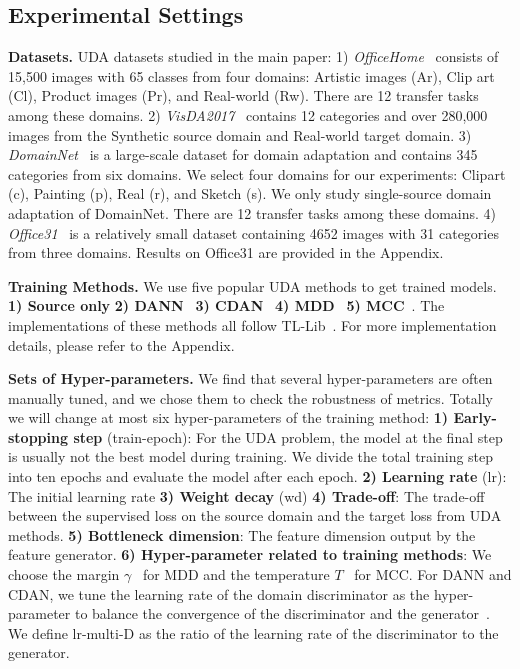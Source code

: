 \documentclass{article} %
\begin{document}
\subsection{Experimental Settings}
\label{sec:4.1}

\textbf{Datasets.} 
UDA datasets studied in the main paper: 
1) \textit{OfficeHome}~\cite{officehome} consists of 15,500 images with 65 classes from four domains: Artistic images (Ar), Clip art (Cl), Product images (Pr), and Real-world (Rw). There are 12 transfer tasks among these domains. 
2) \textit{VisDA2017}~\cite{visda} contains 12 categories and over 280,000 images from the Synthetic source domain and Real-world target domain.  
3) \textit{DomainNet}~\cite{domainnet} is a large-scale dataset for domain adaptation and contains 345 categories from six domains. We select four domains for our experiments: Clipart (c), Painting (p), Real (r), and Sketch (s). We only study single-source domain adaptation of DomainNet. There are 12 transfer tasks among these domains. 
4) \textit{Office31}~\cite{office} is a relatively small dataset containing 4652 images with 31 categories from three domains. Results on Office31 are provided in the Appendix. 

\textbf{Training Methods.} 
We use five popular UDA methods to get trained models. \textbf{1) Source only} \textbf{2) DANN}~\cite{DANN} \textbf{3) CDAN}~\cite{CDAN} \textbf{4) MDD}~\cite{MDD} \textbf{5) MCC}~\cite{MCC}.
The implementations of these methods all follow TL-Lib~\cite{tllib}.
For more implementation details, please refer to the Appendix.

\textbf{Sets of Hyper-parameters.} 
\label{sec:4.1.3}
We find that several hyper-parameters are often manually tuned, and we chose them to check the robustness of metrics. Totally we will change at most six hyper-parameters of the training method: \textbf{1) Early-stopping step} (train-epoch): For the UDA problem, the model at the final step is usually not the best model during training. 
We divide the total training step into ten epochs and evaluate the model after each epoch. 
\textbf{2) Learning rate} (lr): The initial learning rate \textbf{3) Weight decay} (wd) \textbf{4) Trade-off}: The trade-off between the supervised loss on the source domain and the target loss from UDA methods. \textbf{5) Bottleneck dimension}: The feature dimension output by the feature generator. \textbf{6) Hyper-parameter related to training methods}: We choose the margin $\gamma$~\cite{MDD} for MDD and the temperature $T$~\cite{MCC} for MCC. For DANN and CDAN, we tune the learning rate of the domain discriminator as the hyper-parameter to balance the convergence of the discriminator and the generator~\cite{FID}. We define lr-multi-D as the ratio of the learning rate of the discriminator to the generator.
\end{document}
